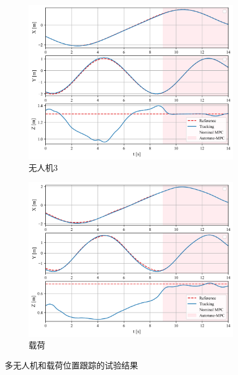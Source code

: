 \documentclass[lang=chs, degree=master, blindreview=true, winfonts=true]{yanputhesis}
\begin{document}
\begin{figure}[hbt!]
    \begin{subfigure}[b]{0.48\textwidth}
        \centering
        \includegraphics[width=\textwidth]{picture/kk/6.png}
        \caption{无人机3}
        \label{quadrotor02}
    \end{subfigure}
    \hfill
    \begin{subfigure}[b]{0.48\textwidth}
        \centering
        \includegraphics[width=\textwidth]{picture/kk/8.png}
        \caption{载荷}
        \label{load0}
    \end{subfigure}
    
    \caption{多无人机和载荷位置跟踪的试验结果}
    \label{t}
\end{figure}
\end{document}
